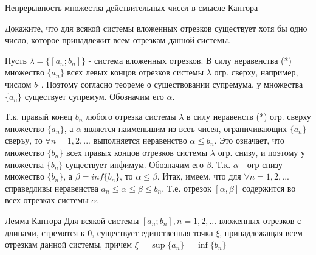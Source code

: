 \documentclass[10pt]{article}
\begin{document}
\begin{problem} Непрерывность множества действительных чисел в смысле Кантора

Докажите, что для всякой системы вложенных отрезков существует хотя бы одно число, которое принадлежит всем отрезкам данной системы.


\end{problem}

\begin{solution}
Пусть $\lambda=\{[a_n;b_n]\}$ - система вложенных отрезков. В силу неравенства (*) множество $\{a_n\}$ всех левых концов отрезков системы $\lambda$ огр. сверху, например, числом $b_1$. Поэтому согласно теореме о существовании супремума, у множества $\{a_n\}$  существует супремум. Обозначим его $\alpha$. 

Т.к. правый конец $ b_n$ любого отрезка системы $\lambda$ в силу неравенств (*) огр. сверху множество $\{a_n\}$, а $\alpha$ является наименьшим из всеъ чисел, ограничивающих $\{a_n\}$ сверъу, то $\forall n=1,2,...$ выполняется неравенство $\alpha \leq b_n$. Это означает, что множество $\{b_n\}$ всех правых концов отрезков системы $\lambda$ огр. снизу, и поэтому у множества $\{b_n\}$ существует инфимум. Обозначим его $\beta$. Т.к. $\alpha$ - огр снизу множество $\{b_n\}$, а     $\beta=inf\{b_n\}$, то $\alpha \leq \beta$. Итак, имеем, что для $\forall n=1,2,...$ справедливы неравенства $a_n \leq \alpha \leq \beta \leq b_n$. Т.е. отрезок $[\alpha,\beta]$ содержится во всех отрезках системы $\alpha$.
\end{solution}


\begin{problem} Лемма Кантора
Для всякой системы $[a_n;b_n], n=1,2,...$ вложенных отрезков с длинами, стремятся к 0, существует единственная точка $\xi$, принадлежащая всем отрезкам данной системы, причем $\xi=\sup\{a_n\}=\inf\{b_n\}$
\end{problem}
\end{document}
